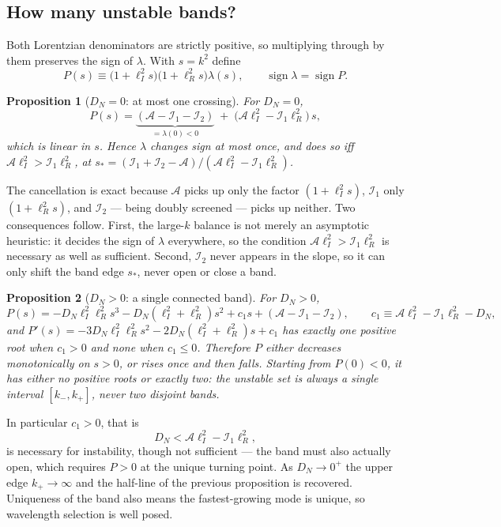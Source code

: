 \documentclass[11pt,a4paper]{article}
\newcommand{\Ai}{\mathcal{A}}
\newcommand{\Ione}{\mathcal{I}_1}
\newcommand{\Itwo}{\mathcal{I}_2}
\newcommand{\lI}{\ell_I}
\newcommand{\lR}{\ell_R}
\theoremstyle{plain}
\newtheorem{prop}{Proposition}
\theoremstyle{remark}
\begin{document}
\subsection{How many unstable bands?}

Both Lorentzian denominators are strictly positive, so multiplying through by
them preserves the sign of $\lambda$. With $s=k^2$ define
\begin{equation}
P(s) \equiv \bigl(1+\lI^2s\bigr)\bigl(1+\lR^2s\bigr)\lambda(s),
\qquad \operatorname{sign}\lambda = \operatorname{sign}P .
\end{equation}

\begin{prop}[$D_N=0$: at most one crossing]
For $D_N=0$,
\begin{equation}
P(s) = \underbrace{(\Ai-\Ione-\Itwo)}_{=\lambda(0)<0}
\;+\; \bigl(\Ai\lI^2 - \Ione\lR^2\bigr)\,s ,
\label{eq:Plinear}
\end{equation}
which is linear in $s$. Hence $\lambda$ changes sign at most once, and does so
iff $\Ai\lI^2>\Ione\lR^2$, at
$s_* = (\Ione+\Itwo-\Ai)/(\Ai\lI^2-\Ione\lR^2)$.
\end{prop}

The cancellation is exact because $\Ai$ picks up only the factor
$(1+\lI^2s)$, $\Ione$ only $(1+\lR^2 s)$, and $\Itwo$ --- being doubly screened
--- picks up neither. Two consequences follow. First, the large-$k$ balance is
not merely an asymptotic heuristic: it decides the sign of $\lambda$ everywhere,
so the condition $\Ai\lI^2>\Ione\lR^2$ is necessary as well as sufficient.
Second, $\Itwo$ never appears in the slope, so it can only shift the band edge
$s_*$, never open or close a band.

\begin{prop}[$D_N>0$: a single connected band]
For $D_N>0$,
\begin{equation}
P(s) = -D_N\lI^2\lR^2 s^3 - D_N(\lI^2+\lR^2)s^2 + c_1 s + (\Ai-\Ione-\Itwo),
\qquad c_1 \equiv \Ai\lI^2-\Ione\lR^2-D_N,
\end{equation}
and $P'(s) = -3D_N\lI^2\lR^2s^2 - 2D_N(\lI^2+\lR^2)s + c_1$ has exactly one
positive root when $c_1>0$ and none when $c_1\le0$. Therefore $P$ either
decreases monotonically on $s>0$, or rises once and then falls. Starting from
$P(0)<0$, it has either no positive roots or exactly two: the unstable set is
always a single interval $[k_-,k_+]$, never two disjoint bands.
\end{prop}

In particular $c_1>0$, that is
\begin{equation}
D_N < \Ai\lI^2 - \Ione\lR^2 ,
\label{eq:DNbound}
\end{equation}
is necessary for instability, though not sufficient --- the band must also
actually open, which requires $P>0$ at the unique turning point. As
$D_N\to0^+$ the upper edge $k_+\to\infty$ and the half-line of the previous
proposition is recovered. Uniqueness of the band also means the fastest-growing
mode is unique, so wavelength selection is well posed.
\end{document}

